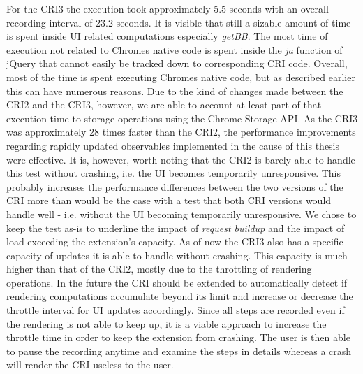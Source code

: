 	For the CRI3 the execution took approximately 5.5 seconds with an overall recording interval of 23.2 seconds. It is visible that still a sizable amount of time is spent inside UI related computations especially \emph{getBB}. The most time of execution not related to Chromes native code is spent inside the \emph{ja} function of jQuery that cannot easily be tracked down to corresponding CRI code. Overall, most of the time is spent executing Chromes native code, but as described earlier this can have numerous reasons. Due to the kind of changes made between the CRI2 and the CRI3, however, we are able to account at least part of that execution time to storage operations using the Chrome Storage API. 
	As the CRI3 was approximately 28 times faster than the CRI2, the performance improvements regarding rapidly updated observables implemented in the cause of this thesis were effective. It is, however, worth noting that the CRI2 is barely able to handle this test without crashing, i.e. the UI becomes temporarily unresponsive. This probably increases the performance differences between the two versions of the CRI more than would be the case with a test that both CRI versions would handle well - i.e. without the UI becoming temporarily unresponsive. We chose to keep the test as-is to underline the impact of \emph{request buildup} and the impact of load exceeding the extension's capacity.
	As of now the CRI3 also has a specific capacity of updates it is able to handle without crashing. This capacity is much higher than that of the CRI2, mostly due to the throttling of rendering operations. In the future the CRI should be extended to automatically detect if rendering computations accumulate beyond its limit and increase or decrease the throttle interval for UI updates accordingly. Since all steps are recorded even if the rendering is not able to keep up, it is a viable approach to increase the throttle time in order to keep the extension from crashing. The user is then able to pause the recording anytime and examine the steps in details whereas a crash will render the CRI useless to the user.
	
